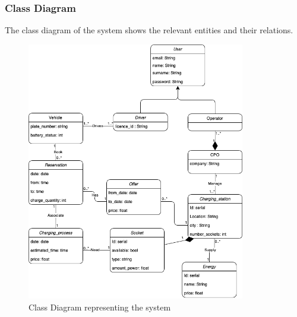\documentclass[../main.tex]{subfiles}
\begin{document}

\newpage
\subsubsection{Class Diagram}
The class diagram of the system shows the relevant entities and their relations. 
\begin{figure}[H]
    \centering
    \includegraphics[width=0.85\textwidth]{images/classDiagram.png}
    \caption{Class Diagram representing the system}
    \label{fig:class}
\end{figure}
\end{document}
